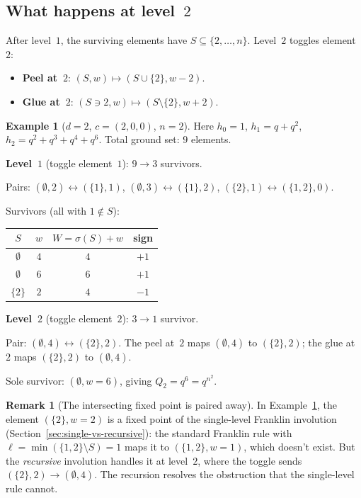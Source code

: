 \documentclass[11pt]{article}
\theoremstyle{plain}
\theoremstyle{definition}
\newtheorem{example}[theorem]{Example}
\newtheorem{remark}[theorem]{Remark}
\begin{document}
\subsection{What happens at level~$2$}

After level~$1$, the surviving elements have
$S \subseteq \{2, \ldots, n\}$.  Level~$2$ toggles
element~$2$:
\begin{itemize}
  \item \textbf{Peel at~$2$}: $(S, w) \mapsto
    (S \cup \{2\}, w - 2)$.
  \item \textbf{Glue at~$2$}: $(S \ni 2, w) \mapsto
    (S \setminus \{2\}, w + 2)$.
\end{itemize}

\begin{example}[$d = 2$, $c = (2,0,0)$, $n = 2$]
\label{ex:d2-n2}
Here $h_0 = 1$, $h_1 = q + q^2$, $h_2 = q^2 + q^3
+ q^4 + q^6$.  Total ground set: $9$ elements.

\medskip\noindent
\textbf{Level~$1$} (toggle element~$1$): $9 \to 3$
survivors.

Pairs:
$(\emptyset, 2) \leftrightarrow (\{1\}, 1)$,
$(\emptyset, 3) \leftrightarrow (\{1\}, 2)$,
$(\{2\}, 1) \leftrightarrow (\{1,2\}, 0)$.

Survivors (all with $1 \notin S$):
\begin{center}
\begin{tabular}{c|c|c|c}
$S$ & $w$ & $W = \sigma(S) + w$ & sign \\ \hline
$\emptyset$ & $4$ & $4$ & $+1$ \\
$\emptyset$ & $6$ & $6$ & $+1$ \\
$\{2\}$ & $2$ & $4$ & $-1$
\end{tabular}
\end{center}

\medskip\noindent
\textbf{Level~$2$} (toggle element~$2$): $3 \to 1$
survivor.

Pair: $(\emptyset, 4) \leftrightarrow (\{2\}, 2)$.  The
peel at~$2$ maps $(\emptyset, 4)$ to $(\{2\}, 2)$;
the glue at~$2$ maps $(\{2\}, 2)$ to $(\emptyset, 4)$.

Sole survivor: $(\emptyset, w{=}6)$, giving
$Q_2 = q^6 = q^{n^2}$.
\end{example}

\begin{remark}[The intersecting fixed point is paired away]
\label{rem:paired-away}
In Example~\ref{ex:d2-n2}, the element $(\{2\}, w{=}2)$
is a fixed point of the single-level Franklin involution
(Section~\ref{sec:single-vs-recursive}): the standard
Franklin rule with $\ell = \min(\{1,2\} \setminus S) = 1$
maps it to $(\{1,2\}, w{=}1)$, which doesn't exist.
But the \emph{recursive} involution handles it at level~$2$,
where the toggle sends $(\{2\}, 2) \to (\emptyset, 4)$.
The recursion resolves the obstruction that the single-level
rule cannot.
\end{remark}
\end{document}
